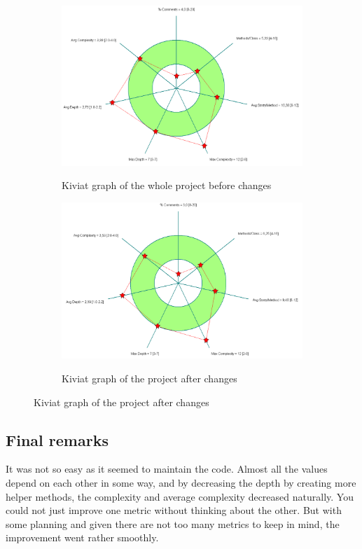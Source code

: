 \documentclass[UKenglish]{article}  %
\begin{document}
\begin{figure}[h]
	\begin{subfigure}[b]{0.5\textwidth}
		\caption{Kiviat graph of the whole project before changes}
		\includegraphics[width=\textwidth]{kiviat_project_baseline}
		\label{project_before}
	\end{subfigure}
	\begin{subfigure}[b]{0.5\textwidth}
		\caption{Kiviat graph of the project after changes}
		\includegraphics[width=\textwidth]{kiviat_project_after}
		\label{project_after}
	\end{subfigure}
\end{figure}


\subsection{Final remarks} It was not so easy as it seemed to maintain the code.
Almost all the values depend on each other in some way, and by decreasing the
depth by creating more helper methods, the complexity and average complexity
decreased naturally. You could not just improve one metric without thinking
about the other. But with some planning and given there are not too many metrics
to keep in mind, the improvement went rather smoothly.
\end{document}
